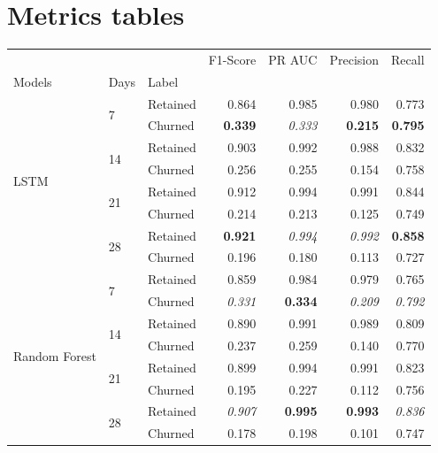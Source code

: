 \documentclass{kththesis}
\begin{document}
\section{Metrics tables}


\begin{table}[h]
\centering
\begin{tabular}{lllrrrr}
\toprule
     &   &          &  F1-Score &    PR AUC &  Precision &    Recall \\
Models & Days & Label &           &           &            &           \\
\midrule
\multirow{8}{*}{LSTM} & \multirow{2}{*}{7} & Retained &  0.864 &  0.985 &   0.980 &  0.773 \\
     &   & Churned &  \textbf{0.339} &  \textit{0.333} &   \textbf{0.215} &  \textbf{0.795} \\
\cline{2-7}
     & \multirow{2}{*}{14} & Retained &  0.903 &  0.992 &   0.988 &  0.832 \\
     &   & Churned &  0.256 &  0.255 &   0.154 &  0.758 \\
\cline{2-7}
     & \multirow{2}{*}{21} & Retained &  0.912 &  0.994 &   0.991 &  0.844 \\
     &   & Churned &  0.214 &  0.213 &   0.125 &  0.749 \\
\cline{2-7}
     & \multirow{2}{*}{28} & Retained &  \textbf{0.921} &  \textit{0.994} &   \textit{0.992} &  \textbf{0.858} \\
     &   & Churned &  0.196 &  0.180 &   0.113 &  0.727 \\
\cline{1-7}
\cline{2-7}
\multirow{8}{*}{Random Forest} & \multirow{2}{*}{7} & Retained &  0.859 &  0.984 &   0.979 &  0.765 \\
     &   & Churned &  \textit{0.331} &  \textbf{0.334} &   \textit{0.209} &  \textit{0.792} \\
\cline{2-7}
     & \multirow{2}{*}{14} & Retained &  0.890 &  0.991 &   0.989 &  0.809 \\
     &   & Churned &  0.237 &  0.259 &   0.140 &  0.770 \\
\cline{2-7}
     & \multirow{2}{*}{21} & Retained &  0.899 &  0.994 &   0.991 &  0.823 \\
     &   & Churned &  0.195 &  0.227 &   0.112 &  0.756 \\
\cline{2-7}
     & \multirow{2}{*}{28} & Retained &  \textit{0.907} &  \textbf{0.995} &   \textbf{0.993} &  \textit{0.836} \\
     &   & Churned &  0.178 &  0.198 &   0.101 &  0.747 \\

\end{tabular}
\end{table}
\end{document}
